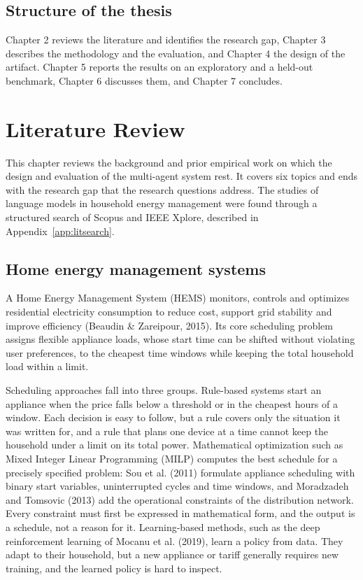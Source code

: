 \documentclass[12pt,a4paper]{report}
\begin{document}
\section{Structure of the thesis}

Chapter 2 reviews the literature and identifies the research gap,
Chapter 3 describes the methodology and the evaluation, and Chapter 4
the design of the artifact. Chapter 5 reports the results on an
exploratory and a held-out benchmark, Chapter 6 discusses them, and
Chapter 7 concludes.

\chapter{Literature Review}
\label{ch:literature}

This chapter reviews the background and prior empirical work on which
the design and evaluation of the multi-agent system rest. It covers
six topics and ends with the research gap that the research questions
address. The studies of language models in household energy management
were found through a structured search of Scopus and IEEE Xplore,
described in Appendix~\ref{app:litsearch}.

\section{Home energy management systems}
\label{sec:hems}

A Home Energy Management System (HEMS) monitors, controls and optimizes
residential electricity consumption to reduce cost, support grid
stability and improve efficiency (Beaudin \& Zareipour, 2015). Its core
scheduling problem assigns flexible appliance loads, whose start time
can be shifted without violating user preferences, to the cheapest time
windows while keeping the total household load within a limit.

Scheduling approaches fall into three groups. Rule-based systems start
an appliance when the price falls below a threshold or in the cheapest
hours of a window. Each decision is easy to follow, but a rule covers
only the situation it was written for, and a rule that plans one device
at a time cannot keep the household under a limit on its total power.
Mathematical optimization such as Mixed Integer Linear Programming
(MILP) computes the best schedule for a precisely specified problem: Sou
et al. (2011) formulate appliance scheduling with binary start
variables, uninterrupted cycles and time windows, and Moradzadeh and
Tomsovic (2013) add the operational constraints of the distribution
network. Every constraint must first be expressed in mathematical form,
and the output is a schedule, not a reason for it. Learning-based
methods, such as the deep reinforcement learning of Mocanu et al.
(2019), learn a policy from data. They adapt to their household, but a
new appliance or tariff generally requires new training, and the learned
policy is hard to inspect.
\end{document}
